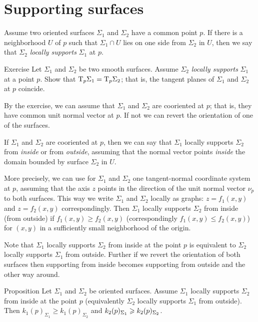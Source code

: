 \section*{Supporting surfaces}

Assume two oriented surfaces $\Sigma_1$ and $\Sigma_2$ have a common point $p$.
If there is a neighborhood $U$ of $p$ such that $\Sigma_1\cap U$ lies on one side from $\Sigma_2$ in $U$, then we say that $\Sigma_2$ \emph{locally supports} $\Sigma_1$ at $p$.

\begin{thm}{Exercise}\label{ex:T=T}
Let $\Sigma_1$ and $\Sigma_2$ be two smooth surfaces.
Assume $\Sigma_2$ \emph{locally supports} $\Sigma_1$ at a point $p$.
Show that $\mathrm{T}_p\Sigma_1=\mathrm{T}_p\Sigma_2$;
that is, the tangent planes of $\Sigma_1$ and $\Sigma_2$ at $p$ coincide.
\end{thm}

By the exercise, we can assume that $\Sigma_1$ and $\Sigma_2$ are cooriented at $p$;
that is, they have common unit normal vector at $p$.
If not we can revert the orientation of one of the surfaces.

If $\Sigma_1$ and $\Sigma_2$ are cooriented at $p$,
then we can say that $\Sigma_1$ locally supports $\Sigma_2$ from \emph{inside} or from \emph{outside},
assuming that the normal vector points \emph{inside} the domain bounded by surface $\Sigma_2$ in $U$.

More precisely, we can use for $\Sigma_1$ and $\Sigma_2$ one tangent-normal coordinate system at $p$,
assuming that the axis $z$ points in the direction of the unit normal vector $\nu_p$ to both surfaces.
This way we write $\Sigma_1$ and $\Sigma_2$ locally as graphs: $z=f_1(x,y)$  and $z=f_2(x,y)$ correspondingly.
Then $\Sigma_1$ locally supports $\Sigma_2$ from inside (from outside)  if $f_1(x,y)\ge f_2(x,y)$ (correspondingly $f_1(x,y)\le f_2(x,y)$) for $(x,y)$ in a sufficiently small neighborhood of the origin.

Note that $\Sigma_1$ locally supports $\Sigma_2$ from inside at the point $p$ is equivalent to $\Sigma_2$ locally supports $\Sigma_1$ from outside.
Further if we revert the orientation of both surfaces then supporting from inside becomes supporting from outside and the other way around.


\begin{thm}{Proposition}\label{prop:surf-support}
Let $\Sigma_1$ and $\Sigma_2$ be oriented surfaces.
Assume $\Sigma_1$ locally supports $\Sigma_2$ from inside at the point $p$ (equivalently $\Sigma_2$ locally supports $\Sigma_1$ from outside).
Then $k_1(p)_{\Sigma_1}\ge k_1(p)_{\Sigma_2}$ and $k_2(p)_{\Sigma_1}\z\ge k_2(p)_{\Sigma_2}$.
\end{thm}

